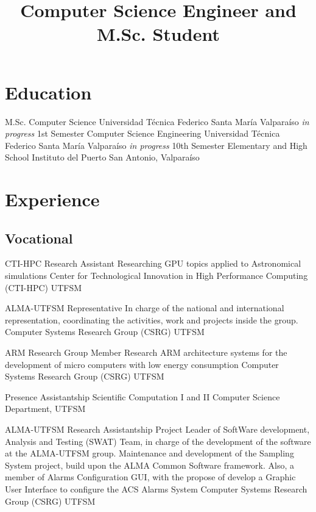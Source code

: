 \documentclass[11pt,a4paper]{moderncv}
\title{\large Computer Science Engineer and M.Sc. Student}               %
\begin{document}
\maketitle

\section{Education}
	{M.Sc. Computer Science}
	{Universidad Técnica Federico Santa María}
	{Valparaíso}
	{\emph{in progress}}
	{1st Semester}
	{Computer Science Engineering}
	{Universidad Técnica Federico Santa María}
	{Valparaíso}
	{\emph{in progress}}
	{10th Semester}
	{Elementary and High School}
	{Instituto del Puerto}
	{San Antonio, Valparaíso}
	{}{}

\vspace{-0.5cm}
\section{Experience}
\subsection{Vocational}

    {CTI-HPC Research Assistant}
    {Researching GPU topics applied to Astronomical simulations}
    {Center for Technological Innovation in High Performance Computing (CTI-HPC)}
    {UTFSM}
    {}

	{ALMA-UTFSM Representative}
	{In charge of the national and international representation, coordinating the activities, work and projects inside the group.}
	{Computer Systems Research Group (CSRG)}
	{UTFSM}
	{}

	{ARM Research Group Member}
	{Research ARM architecture systems for the development of micro computers with low energy consumption}
	{Computer Systems Research Group (CSRG)}
	{UTFSM}
	{}

	{Presence Assistantship}
	{Scientific Computation I and II}
	{Computer Science Department, UTFSM}
	{}{}

	{ALMA-UTFSM Research Assistantship}
	{Project Leader of SoftWare development, Analysis and Testing (SWAT) Team, in charge of the development of the software at the ALMA-UTFSM group.
	Maintenance and development of the Sampling System project, build upon the ALMA Common Software framework.
	Also, a member of Alarms Configuration GUI, with the propose of develop a Graphic User Interface to configure the ACS Alarms System}
	{Computer Systems Research Group (CSRG)}
	{UTFSM}
	{}
\end{document}
